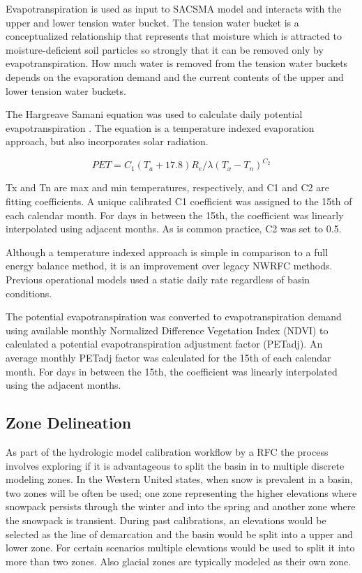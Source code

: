 \documentclass{agujournal2019}
\begin{document}
Evapotranspiration is used as input to SACSMA model and interacts with the upper and lower tension water bucket. The  tension water bucket is a conceptualized relationship that represents that moisture which is attracted to moisture-deficient soil particles so strongly that it can be removed only by evapotranspiration. How much water is removed from the tension water buckets depends on the evaporation demand and the current contents of the upper and lower tension water buckets.

The Hargreave Samani equation was used to calculate daily potential evapotranspiration \cite{Hargreaves_1982} . 
The equation is a temperature indexed evaporation approach, but also incorporates solar radiation.

\begin{equation}
    PET=C_1(T_a+17.8) R_e/\lambda(T_x-T_n )^{C_2 }
\end{equation}

Tx and Tn are max and min temperatures, respectively, and C1 and C2 are fitting coefficients. A unique calibrated C1 coefficient was assigned to the 15th of each calendar month. For days in between the 15th, the coefficient was linearly interpolated using adjacent months. As is common practice, C2 was set to 0.5. 

Although a temperature indexed approach is simple in comparison to a full energy balance method, it is an improvement over legacy NWRFC methods. Previous operational models used a static daily rate regardless of basin conditions. 

The potential evapotranspiration was converted to evapotranspiration demand using available monthly Normalized Difference Vegetation Index (NDVI) to calculated a potential evapotranspiration adjustment factor (PETadj). An average monthly PETadj factor was calculated for the 15th of each calendar month. For days in between the 15th, the coefficient was linearly interpolated using the adjacent months. 


\subsection{Zone Delineation}

As part of the hydrologic model calibration workflow by a RFC the process involves exploring if it is advantageous to split the basin in to multiple discrete modeling zones. In the Western United states, when snow is prevalent in a basin, two zones will be often be used; one zone representing the higher elevations where snowpack persists through the winter and into the spring and another zone where the snowpack is transient. During past calibrations, an elevations would be selected as the line of demarcation and the basin would be split into a upper and lower zone. For certain scenarios multiple elevations would be used to split it into more than two zones. Also glacial zones are typically modeled as their own zone.
\end{document}

